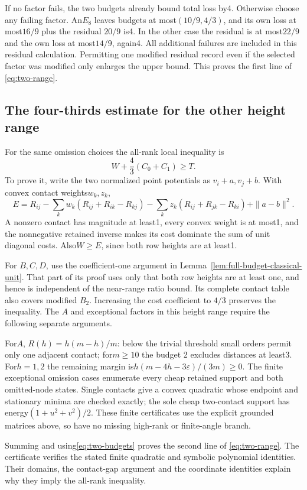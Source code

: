 \documentclass[11pt]{article}
\theoremstyle{remark}\newtheorem{remark}[theorem]{Remark}
\begin{document}
If no factor fails, the two budgets already bound total loss by4.
Otherwise choose any failing factor. An$E_8$ leaves budgets at
most$(10/9,4/3)$, and its own loss at most$16/9$ plus the residual
$20/9$ is4. In the other case the residual is at most$22/9$ and
the own loss at most$14/9$, again4. All additional failures are
included in this residual calculation. Permitting one modified
residual record even if the selected factor was modified only
enlarges the upper bound. This proves the first line of
\eqref{eq:two-range}.

\subsection{The four-thirds estimate for the other height range}

For the same omission choices the all-rank local inequality is
\[
 W+\frac43(C_0+C_1)\ge T .
\]
To prove it, write the two normalized point potentials as
$v_i+a,v_j+b$. With convex contact weights$w_k,z_k$,
\[
 E=R_{ij}-\sum_kw_k(R_{ij}+R_{ik}-R_{kj})
             -\sum_kz_k(R_{ij}+R_{jk}-R_{ki})+\|a-b\|^2.
\]
A nonzero contact has magnitude at least1, every convex weight is at
most1, and the nonnegative retained inverse makes its cost dominate
the sum of unit diagonal costs. Also$W\ge E$, since both row
heights are at least1.

For $B,C,D$, use the coefficient-one argument in
Lemma~\ref{lem:full-budget-classical-unit}. That part of its proof uses
only that both row heights are at least one, and hence is independent
of the near-range ratio bound. Its complete contact table also covers
modified $B_2$. Increasing the cost coefficient to $4/3$ preserves the
inequality. The $A$ and exceptional factors in this height range
require the following separate arguments.

For$A$, $R(h)=h(m-h)/m$: below the trivial threshold small
orders permit only one adjacent contact; for$m\ge10$ the budget
2 excludes distances at least3. For$h=1,2$ the remaining margin
is$h(m-4h-3\varepsilon)/(3m)\ge0$.
The finite exceptional omission cases enumerate every cheap
retained support and both omitted-node states. Single contacts
give a convex quadratic whose endpoint and stationary minima
are checked exactly; the sole cheap two-contact support has
energy$(1+u^2+v^2)/2$. These finite certificates use the
explicit grounded matrices above, so have no missing high-rank
or finite-angle branch.

Summing and using\eqref{eq:two-budgets} proves the second line of
\eqref{eq:two-range}. The certificate verifies the stated finite
quadratic and symbolic polynomial identities. Their domains,
the contact-gap argument and the coordinate identities explain
why they imply the all-rank inequality.
\end{document}
